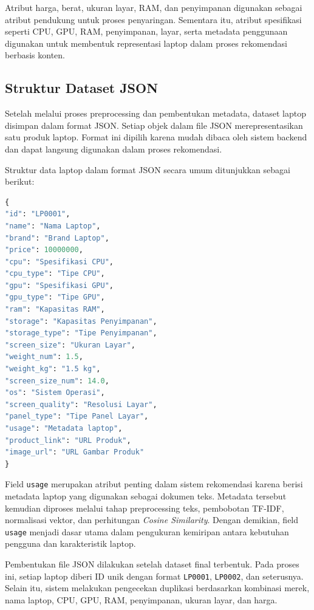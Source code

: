 Atribut harga, berat, ukuran layar, RAM, dan penyimpanan digunakan sebagai atribut pendukung untuk proses penyaringan. Sementara itu, atribut spesifikasi seperti CPU, GPU, RAM, penyimpanan, layar, serta metadata penggunaan digunakan untuk membentuk representasi laptop dalam proses rekomendasi berbasis konten.

\subsection{Struktur Dataset JSON}
Setelah melalui proses preprocessing dan pembentukan metadata, dataset laptop disimpan dalam format JSON. Setiap objek dalam file JSON merepresentasikan satu produk laptop. Format ini dipilih karena mudah dibaca oleh sistem backend dan dapat langsung digunakan dalam proses rekomendasi.

\noindent Struktur data laptop dalam format JSON secara umum ditunjukkan sebagai berikut:
\begin{lstlisting}[basicstyle=\linespread{0.8}\ttfamily\footnotesize, language=Python, breaklines=true, caption={Struktur Data Laptop dalam Format JSON}, label=kode:struktur_json_laptop]
{
"id": "LP0001",
"name": "Nama Laptop",
"brand": "Brand Laptop",
"price": 10000000,
"cpu": "Spesifikasi CPU",
"cpu_type": "Tipe CPU",
"gpu": "Spesifikasi GPU",
"gpu_type": "Tipe GPU",
"ram": "Kapasitas RAM",
"storage": "Kapasitas Penyimpanan",
"storage_type": "Tipe Penyimpanan",
"screen_size": "Ukuran Layar",
"weight_num": 1.5,
"weight_kg": "1.5 kg",
"screen_size_num": 14.0,
"os": "Sistem Operasi",
"screen_quality": "Resolusi Layar",
"panel_type": "Tipe Panel Layar",
"usage": "Metadata laptop",
"product_link": "URL Produk",
"image_url": "URL Gambar Produk"
}
\end{lstlisting}

Field \texttt{usage} merupakan atribut penting dalam sistem rekomendasi karena berisi metadata laptop yang digunakan sebagai dokumen teks. Metadata tersebut kemudian diproses melalui tahap preprocessing teks, pembobotan TF-IDF, normalisasi vektor, dan perhitungan \textit{Cosine Similarity}. Dengan demikian, field \texttt{usage} menjadi dasar utama dalam pengukuran kemiripan antara kebutuhan pengguna dan karakteristik laptop.

Pembentukan file JSON dilakukan setelah dataset final terbentuk. Pada proses ini, setiap laptop diberi ID unik dengan format \texttt{LP0001}, \texttt{LP0002}, dan seterusnya. Selain itu, sistem melakukan pengecekan duplikasi berdasarkan kombinasi merek, nama laptop, CPU, GPU, RAM, penyimpanan, ukuran layar, dan harga.


